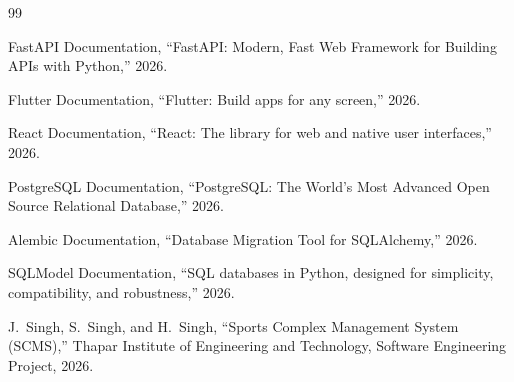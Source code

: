 \documentclass[12pt,a4paper,oneside]{report}
\begin{document}
\begin{thebibliography}{99}

FastAPI Documentation, ``FastAPI: Modern, Fast Web Framework for Building APIs with Python,'' 2026.

Flutter Documentation, ``Flutter: Build apps for any screen,'' 2026.

React Documentation, ``React: The library for web and native user interfaces,'' 2026.

PostgreSQL Documentation, ``PostgreSQL: The World's Most Advanced Open Source Relational Database,'' 2026.

Alembic Documentation, ``Database Migration Tool for SQLAlchemy,'' 2026.

SQLModel Documentation, ``SQL databases in Python, designed for simplicity, compatibility, and robustness,'' 2026.

J.~Singh, S.~Singh, and H.~Singh, ``Sports Complex Management System (SCMS),'' Thapar Institute of Engineering and Technology, Software Engineering Project, 2026.

\end{thebibliography}
\end{document}
